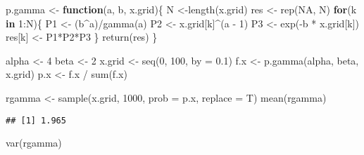 \documentclass[
  12pt,
  spanish,
]{book}
\newenvironment{Shaded}{\begin{snugshade}}{\end{snugshade}}
\newcommand{\AttributeTok}[1]{\textcolor[rgb]{0.77,0.63,0.00}{#1}}
\newcommand{\ConstantTok}[1]{\textcolor[rgb]{0.00,0.00,0.00}{#1}}
\newcommand{\ControlFlowTok}[1]{\textcolor[rgb]{0.13,0.29,0.53}{\textbf{#1}}}
\newcommand{\DecValTok}[1]{\textcolor[rgb]{0.00,0.00,0.81}{#1}}
\newcommand{\FloatTok}[1]{\textcolor[rgb]{0.00,0.00,0.81}{#1}}
\newcommand{\FunctionTok}[1]{\textcolor[rgb]{0.00,0.00,0.00}{#1}}
\newcommand{\NormalTok}[1]{#1}
\newcommand{\OtherTok}[1]{\textcolor[rgb]{0.56,0.35,0.01}{#1}}
\newcommand{\SpecialCharTok}[1]{\textcolor[rgb]{0.00,0.00,0.00}{#1}}
\theoremstyle{definition}
\theoremstyle{definition}
\theoremstyle{definition}
\theoremstyle{definition}
\theoremstyle{remark}
\begin{document}
\begin{Shaded}
\begin{Highlighting}[]
\NormalTok{p.gamma }\OtherTok{\textless{}{-}} \ControlFlowTok{function}\NormalTok{(a, b, x.grid)\{}
\NormalTok{  N }\OtherTok{\textless{}{-}}\FunctionTok{length}\NormalTok{(x.grid)}
\NormalTok{  res }\OtherTok{\textless{}{-}} \FunctionTok{rep}\NormalTok{(}\ConstantTok{NA}\NormalTok{, N)}
  \ControlFlowTok{for}\NormalTok{(k }\ControlFlowTok{in} \DecValTok{1}\SpecialCharTok{:}\NormalTok{N)\{}
\NormalTok{    P1 }\OtherTok{\textless{}{-}}\NormalTok{ (b}\SpecialCharTok{\^{}}\NormalTok{a)}\SpecialCharTok{/}\FunctionTok{gamma}\NormalTok{(a)}
\NormalTok{    P2 }\OtherTok{\textless{}{-}}\NormalTok{ x.grid[k]}\SpecialCharTok{\^{}}\NormalTok{(a }\SpecialCharTok{{-}} \DecValTok{1}\NormalTok{)}
\NormalTok{    P3 }\OtherTok{\textless{}{-}} \FunctionTok{exp}\NormalTok{(}\SpecialCharTok{{-}}\NormalTok{b }\SpecialCharTok{*}\NormalTok{ x.grid[k])}
\NormalTok{    res[k] }\OtherTok{\textless{}{-}}\NormalTok{ P1}\SpecialCharTok{*}\NormalTok{P2}\SpecialCharTok{*}\NormalTok{P3}
\NormalTok{  \}}
  \FunctionTok{return}\NormalTok{(res)}
\NormalTok{\}}

\NormalTok{alpha }\OtherTok{\textless{}{-}} \DecValTok{4}
\NormalTok{beta }\OtherTok{\textless{}{-}} \DecValTok{2}
\NormalTok{x.grid }\OtherTok{\textless{}{-}} \FunctionTok{seq}\NormalTok{(}\DecValTok{0}\NormalTok{, }\DecValTok{100}\NormalTok{, }\AttributeTok{by =} \FloatTok{0.1}\NormalTok{)}
\NormalTok{f.x }\OtherTok{\textless{}{-}} \FunctionTok{p.gamma}\NormalTok{(alpha, beta, x.grid)}
\NormalTok{p.x }\OtherTok{\textless{}{-}}\NormalTok{ f.x }\SpecialCharTok{/} \FunctionTok{sum}\NormalTok{(f.x)}

\NormalTok{rgamma }\OtherTok{\textless{}{-}} \FunctionTok{sample}\NormalTok{(x.grid, }\DecValTok{1000}\NormalTok{, }\AttributeTok{prob =}\NormalTok{ p.x, }\AttributeTok{replace =}\NormalTok{ T)}
\FunctionTok{mean}\NormalTok{(rgamma)}
\end{Highlighting}
\end{Shaded}

\begin{verbatim}
## [1] 1.965
\end{verbatim}

\begin{Shaded}
\begin{Highlighting}[]
\FunctionTok{var}\NormalTok{(rgamma)}
\end{Highlighting}
\end{Shaded}
\end{document}
